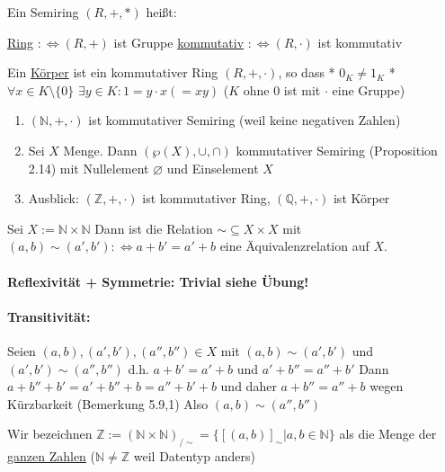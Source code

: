 \documentclass{../../meta/tudscript}
\begin{document}
Ein Semiring \((R,+,*)\) heißt:

\underline{Ring} \(:\iff (R,+)\) ist Gruppe \underline{kommutativ}
\(:\iff (R,\cdot )\) ist kommutativ

Ein \underline{Körper} ist ein kommutativer Ring \((R,+,\cdot )\), so
dass * \(0_K \neq 1_K\) * \(\forall x \in K \setminus \{0\}\)
\(\exists y \in K: 1=y \cdot x (=xy)\) (\(K\) ohne \(0\) ist mit
\(\cdot\) eine Gruppe)


\begin{enumerate}

\item
  \((\mathbb{N},+,\cdot )\) ist kommutativer Semiring (weil keine
  negativen Zahlen)
\item
  Sei \(X\) Menge. Dann \((\wp(X),\cup ,\cap )\) kommutativer Semiring
  (Proposition 2.14) mit Nullelement \(\varnothing\) und Einselement
  \(X\)
\item
  Ausblick: \((\mathbb{Z},+,\cdot )\) ist kommutativer Ring,
  \((\mathbb{Q},+,\cdot )\) ist Körper
\end{enumerate}


Sei \(X:= \mathbb{N}\times \mathbb{N}\) Dann ist die Relation
\(\sim \subseteq X \times X\) mit \((a,b) \sim (a',b'):\iff a+b'=a'+b\)
eine Äquivalenzrelation auf \(X\).


\paragraph{Reflexivität + Symmetrie: Trivial siehe Übung!}

\paragraph{Transitivität:}

Seien \((a,b),(a',b'),(a'',b'') \in X\) mit \((a,b) \sim (a',b')\) und
\((a',b') \sim (a'',b'')\) d.h. \(a+b'=a'+b\) und \(a'+b''=a''+b'\) Dann
\(a+b''+b'=a'+b''+b=a''+b'+b\) und daher \(a+b''=a''+b\) wegen
Kürzbarkeit (Bemerkung 5.9,1) Also \((a,b) \sim (a'',b'')\)


Wir bezeichnen
\(\mathbb{Z}:= ( \mathbb{N}\times \mathbb{N})_{/\sim} = \{ [ (a,b) ]_\sim | a,b \in \mathbb{N}\}\)
als die Menge der \underline{ganzen Zahlen}
(\(\mathbb{N}\neq \mathbb{Z}\) weil Datentyp anders)
\end{document}
